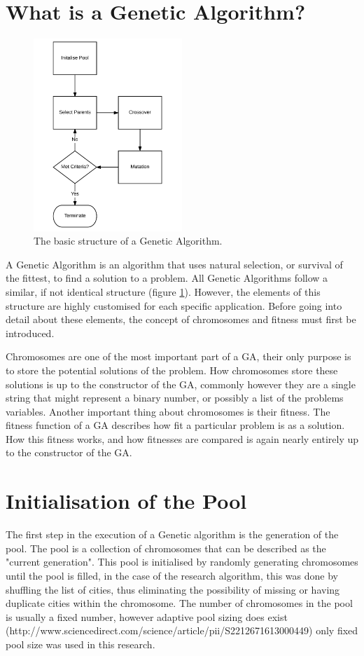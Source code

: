 \section{What is a Genetic Algorithm?}
\begin{figure}[h]
	\centering
		\includegraphics[width=0.5\textwidth]{GA_Structure}
	\caption{The basic structure of a Genetic Algorithm.}
	\label{struct}
\end{figure}
\noindent
A Genetic Algorithm is an algorithm that uses natural selection, or survival of the fittest, to find a solution to a problem. All Genetic Algorithms follow a similar, if not identical structure (figure \ref{struct}). However, the elements of this structure are highly customised for each specific application. Before going into detail about these elements, the concept of chromosomes and fitness must first be introduced.
\par
Chromosomes are one of the most important part of a GA, their only purpose is to store the potential solutions of the problem. How chromosomes store these solutions is up to the constructor of the GA, commonly however they are a single string that might represent a binary number, or possibly a list of the problems variables. Another important thing about chromosomes is their fitness. The fitness function of a GA describes how fit a particular problem is as a solution. How this fitness works, and how fitnesses are compared is again nearly entirely up to the constructor of the GA.


\section{Initialisation of the Pool}
\par
The first step in the execution of a Genetic algorithm is the generation of the pool. The pool is a collection of chromosomes that can be described as the "current generation". This pool is initialised by randomly generating chromosomes until the pool is filled, in the case of the research algorithm, this was done by shuffling the list of cities, thus eliminating the possibility of missing or having duplicate cities within the chromosome. The number of chromosomes in the pool is usually a fixed number, however adaptive pool sizing does exist (http://www.sciencedirect.com/science/article/pii/S2212671613000449) only fixed pool size was used in this research. 
